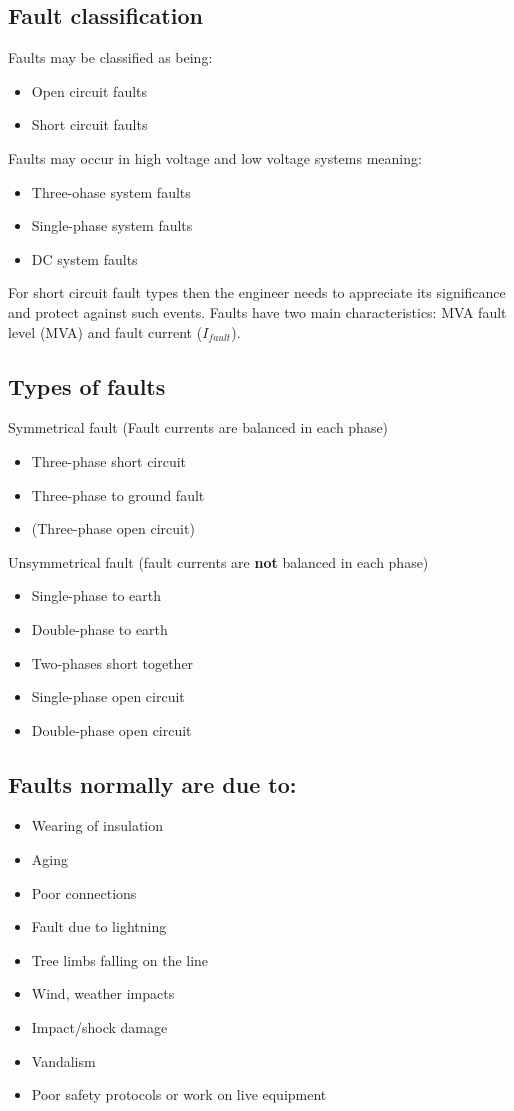 \documentclass[class=report, crop=false, 12pt,a4paper]{standalone}
\begin{document}
\subsection{Fault classification}
Faults may be classified as being:
\begin{itemize}
	\item Open circuit faults
	\item Short circuit faults
\end{itemize}
Faults may occur in high voltage and low voltage systems meaning:
\begin{itemize}
	\item Three-ohase system faults
	\item Single-phase system faults
	\item DC system faults
\end{itemize}
For short circuit fault types then the engineer needs to appreciate its significance and protect against such events. Faults have two main characteristics: MVA fault level (\si{MVA}) and fault current ($I_{fault}$).
\subsection{Types of faults}
Symmetrical fault (Fault currents are balanced in each phase)
\begin{itemize}
	\item Three-phase short circuit
	\item Three-phase to ground fault
	\item (Three-phase open circuit)
\end{itemize}
Unsymmetrical fault (fault currents are \textbf{not} balanced in each phase)
\begin{itemize}
	\item Single-phase to earth
	\item Double-phase to earth
	\item Two-phases short together
	\item Single-phase open circuit
	\item Double-phase open circuit
\end{itemize}
\subsection{Faults normally are due to:}
\begin{itemize}
	\item Wearing of insulation
	\item Aging
	\item Poor connections
	\item Fault due to lightning
	\item Tree limbs falling on the line
	\item Wind, weather impacts
	\item Impact/shock damage
	\item Vandalism
	\item Poor safety protocols or work on live equipment
\end{itemize}
\end{document}

